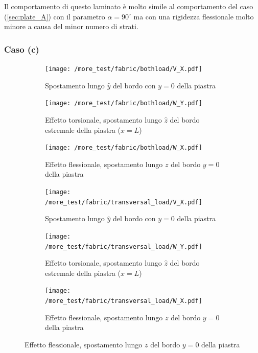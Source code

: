 \documentclass[a4paper,num-refs]{oup-contemporary}
\begin{document}
Il comportamento di questo laminato è molto simile al comportamento del caso (\cref{sec:plate_A}) con il parametro $\alpha=90^\circ$ ma con una rigidezza flessionale molto minore a causa del minor numero di strati. 


\subsubsection{Caso (c)}
\label{sec:plate_C}

\begin{figure}[bt!]
	\centering
	
	\begin{subfigure}[t]{0.3\textwidth}
		\centering
		\texttt{[image: /more\_test/fabric/bothload/V\_X.pdf]}
		\caption{Spostamento lungo $\hat y$ del bordo con $y=0$ della piastra}
		
	\end{subfigure}
	\hfill
	\begin{subfigure}[t]{0.3\textwidth}
		\centering
		\texttt{[image: /more\_test/fabric/bothload/W\_Y.pdf]}
		
		\caption{Effetto torsionale, spostamento lungo $\hat z$ del bordo estremale della piastra ($x=L$)}
		
	\end{subfigure}
	\hfill
	\begin{subfigure}[t]{0.3\textwidth}
		\centering
		\texttt{[image: /more\_test/fabric/bothload/W\_X.pdf]}
		\caption{Effetto flessionale, spostamento lungo $z$ del bordo $y=0$ della piastra}
		
	\end{subfigure}
	\hfill
	\caption{Risultati caso (c) per un elemento strutturale tipo piastra con entrambi i carichi (\cref{sec:plate_C})}
	\label{fig:plate_C_both_load}
	\centering
	
	\begin{subfigure}[t]{0.3\textwidth}
		\centering
		\texttt{[image: /more\_test/fabric/transversal\_load/V\_X.pdf]}
		\caption{Spostamento lungo $\hat y$ del bordo con $y=0$ della piastra}
		
	\end{subfigure}
	\hfill
	\begin{subfigure}[t]{0.3\textwidth}
		\centering
		\texttt{[image: /more\_test/fabric/transversal\_load/W\_Y.pdf]}
		
		\caption{Effetto torsionale, spostamento lungo $\hat z$ del bordo estremale della piastra ($x=L$)}
		
	\end{subfigure}
	\hfill
	\begin{subfigure}[t]{0.3\textwidth}
		\centering
		\texttt{[image: /more\_test/fabric/transversal\_load/W\_X.pdf]}
		\caption{Effetto flessionale, spostamento lungo $z$ del bordo $y=0$ della piastra}
		

\end{subfigure}
\end{figure}
\end{document}
